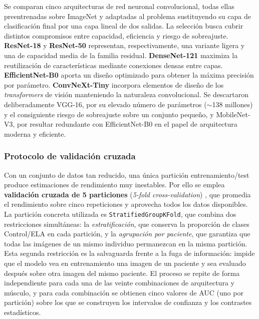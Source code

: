 \documentclass[12pt]{extarticle}
\numberwithin{equation}{section}
\begin{document}
\begin{refsection}
Se comparan cinco arquitecturas de red neuronal convolucional, todas ellas preentrenadas sobre ImageNet y adaptadas al problema sustituyendo su capa de clasificación final por una capa lineal de dos salidas. La selección busca cubrir distintos compromisos entre capacidad, eficiencia y riesgo de sobreajuste. \textbf{ResNet-18} y \textbf{ResNet-50} \cite{he2016deep} representan, respectivamente, una variante ligera y una de capacidad media de la familia residual. \textbf{DenseNet-121} \cite{huang2017densely} maximiza la reutilización de características mediante conexiones densas entre capas. \textbf{EfficientNet-B0} \cite{tan2019efficientnet} aporta un diseño optimizado para obtener la máxima precisión por parámetro. \textbf{ConvNeXt-Tiny} \cite{liu2022convnet} incorpora elementos de diseño de los \textit{transformers} de visión manteniendo la naturaleza convolucional. Se descartaron deliberadamente VGG-16, por su elevado número de parámetros ($\sim$138 millones) y el consiguiente riesgo de sobreajuste sobre un conjunto pequeño, y MobileNet-V3, por resultar redundante con EfficientNet-B0 en el papel de arquitectura moderna y eficiente.

\subsubsection{Protocolo de validación cruzada}

Con un conjunto de datos tan reducido, una única partición entrenamiento/test produce estimaciones de rendimiento muy inestables. Por ello se emplea \textbf{validación cruzada de 5 particiones} (\textit{5-fold cross-validation}) \cite{kohavi1995study}, que promedia el rendimiento sobre cinco repeticiones y aprovecha todos los datos disponibles. La partición concreta utilizada es \texttt{Stratified\allowbreak Group\allowbreak KFold}, que combina dos restricciones simultáneas: la \textit{estratificación}, que conserva la proporción de clases Control/ELA en cada partición, y la \textit{agrupación por paciente}, que garantiza que todas las imágenes de un mismo individuo permanezcan en la misma partición. Esta segunda restricción es la salvaguarda frente a la fuga de información: impide que el modelo vea en entrenamiento una imagen de un paciente y sea evaluado después sobre otra imagen del mismo paciente. El proceso se repite de forma independiente para cada una de las veinte combinaciones de arquitectura y músculo, y para cada combinación se obtienen cinco valores de AUC (uno por partición) sobre los que se construyen los intervalos de confianza y los contrastes estadísticos.


\end{refsection}
\end{document}
